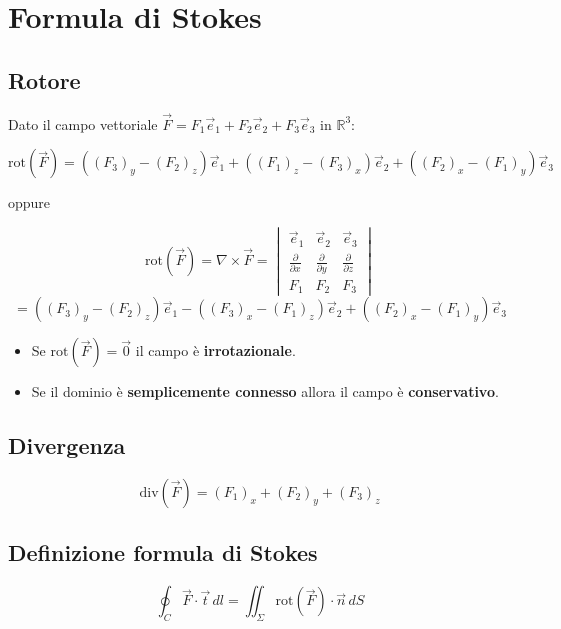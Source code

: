 \chapter{Formula di Stokes}

\section{Rotore}

Dato il campo vettoriale $\vec{F} = F_1\vec{e}_1 + F_2\vec{e}_2 + F_3\vec{e}_3$ in $\mathbb{R}^3$:

\[
\text{rot}(\vec{F}) = \left( (F_3)_y - (F_2)_z \right)\vec{e}_1 + \left( (F_1)_z - (F_3)_x \right)\vec{e}_2 + \left( (F_2)_x - (F_1)_y \right)\vec{e}_3
\]

oppure

\[
\text{rot}(\vec{F}) = \nabla \times \vec{F} = 
\begin{vmatrix}
\vec{e}_1 & \vec{e}_2 & \vec{e}_3 \\
\frac{\partial}{\partial x} & \frac{\partial}{\partial y} & \frac{\partial}{\partial z} \\
F_1 & F_2 & F_3
\end{vmatrix}
\]
\[
= \left( (F_3)_y - (F_2)_z \right)\vec{e}_1 - \left( (F_3)_x - (F_1)_z \right)\vec{e}_2 + \left( (F_2)_x - (F_1)_y \right)\vec{e}_3
\]

\begin{itemize}
    \item Se $\text{rot}(\vec{F}) = \vec{0}$ il campo è \textbf{irrotazionale}.
    \item Se il dominio è \textbf{semplicemente connesso} allora il campo è \textbf{conservativo}.
\end{itemize}

\section{Divergenza}

\[
\text{div}(\vec{F}) = (F_1)_x + (F_2)_y + (F_3)_z
\]

\section{Definizione formula di Stokes}

\[
\oint_{C} \vec{F} \cdot \vec{t} \, dl = \iint_{\Sigma} \text{rot}(\vec{F}) \cdot \vec{n} \, dS
\]